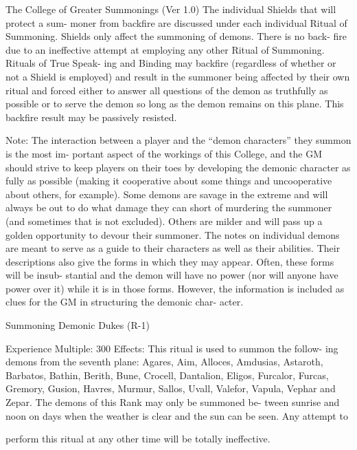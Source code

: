 \begin{Chapter}{The College of Greater Summonings (Ver 1.0)}
The  individual  Shields  that  will  protect  a  sum-
moner  from  backfire  are  discussed  under  each 
individual  Ritual  of  Summoning.  Shields  only 
affect the summoning of demons. There is no back-
fire due to an ineffective attempt at employing any 
other Ritual of Summoning. Rituals of True Speak-
ing  and  Binding  may  backfire  (regardless  of 
whether or not a Shield is employed) and result in 
the  summoner  being  affected  by  their  own  ritual 
and  forced  either  to  answer  all  questions  of  the 
demon  as  truthfully  as  possible  or  to  serve  the 
demon so long as the demon remains on this plane. 
This backfire result may be passively resisted. 

Note:  The  interaction  between  a  player  and  the 
“demon  characters”  they  summon  is  the  most  im-
portant aspect of the workings of this College, and 
the GM should strive to keep players on their toes 
by  developing  the  demonic  character  as  fully  as 
possible  (making  it  cooperative  about  some  things 
and  uncooperative  about  others,  for  example). 
Some  demons  are  savage  in  the  extreme  and  will 
always be out to do what damage they can short of 
murdering  the  summoner  (and  sometimes  that  is 
not excluded). Others are milder and will pass up a 
golden opportunity to devour their summoner. The 
notes on individual demons are meant to serve as a 
guide  to  their  characters  as  well  as  their  abilities. 
Their  descriptions  also  give  the  forms  in  which 
they may appear. Often, these forms will be insub-
stantial  and  the  demon  will  have  no  power  (nor 
will anyone have power over it) while it is in those 
forms.  However,  the  information  is  included  as 
clues  for  the  GM  in  structuring  the  demonic  char-
acter. 

Summoning Demonic Dukes (R-1) 

Experience Multiple: 300 
Effects:  This  ritual  is  used  to  summon  the  follow-
ing  demons  from  the  seventh  plane:  Agares,  Aim, 
Alloces,  Amdusias,  Astaroth,  Barbatos,  Bathin, 
Berith,  Bune, Crocell,  Dantalion,  Eligos,  Furcalor, 
Furcas, Gremory, Gusion, Havres, Murmur, Sallos, 
Uvall,  Valefor,  Vapula,  Vephar  and  Zepar.  The 
demons  of  this  Rank  may  only  be  summoned  be-
tween sunrise and noon on days  when the weather 
is  clear  and  the  sun  can  be  seen.  Any  attempt  to 

perform this ritual at any other time will be totally 
ineffective. 


\end{Chapter}
